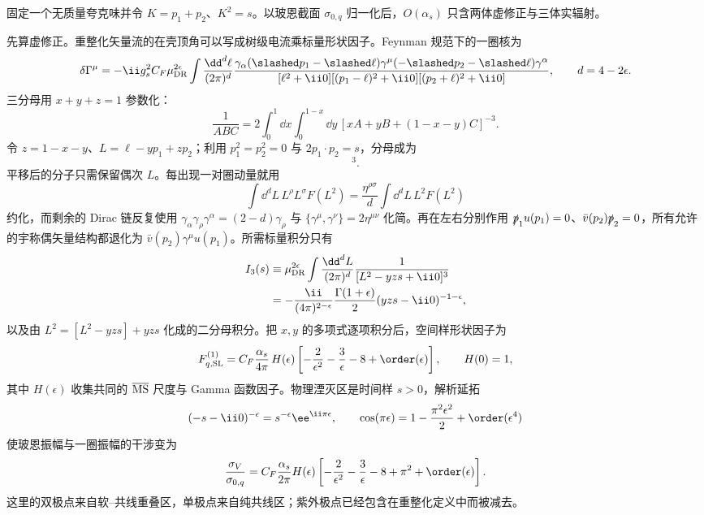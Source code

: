 \begin{derivation}[强子产生率中的实虚抵消]
固定一个无质量夸克味并令 $K=p_1+p_2$、$K^2=s$。以玻恩截面 $\sigma_{0,q}$ 归一化后，$O(\alpha_s)$ 只含两体虚修正与三体实辐射。

先算虚修正。重整化矢量流的在壳顶角可以写成树级电流乘标量形状因子。Feynman 规范下的一圈核为
\begin{equation*}
 \delta\Gamma^\mu
 =-\ii g_s^2 C_F\mu_{\rm DR}^{2\epsilon}
 \int\frac{\dd^d\ell}{(2\pi)^d}
 \frac{\gamma_\alpha(\slashed p_1-\slashed\ell)\gamma^\mu
 (-\slashed p_2-\slashed\ell)\gamma^\alpha}
 {[\ell^2+\ii0][(p_1-\ell)^2+\ii0][(p_2+\ell)^2+\ii0]},
 \qquad d=4-2\epsilon .
\end{equation*}
三分母用 $x+y+z=1$ 参数化：
\begin{equation*}
 \frac1{ABC}
 =2\int_0^1\dd x\int_0^{1-x}\dd y\,
 [xA+yB+(1-x-y)C]^{-3}.
\end{equation*}
令 $z=1-x-y$、$L=\ell-yp_1+zp_2$；利用 $p_1^2=p_2^2=0$ 与 $2p_1\!\cdot p_2=s$，分母成为
\begin{equation*}
 [L^2-yzs+\ii0]^3.
\end{equation*}
平移后的分子只需保留偶次 $L$。每出现一对圈动量就用
\begin{equation*}
 \int\dd^dL\,L^\rho L^\sigma F(L^2)
 =\frac{\eta^{\rho\sigma}}d\int\dd^dL\,L^2F(L^2)
\end{equation*}
约化，而剩余的 Dirac 链反复使用 $\gamma_\alpha\gamma_\rho\gamma^\alpha=(2-d)\gamma_\rho$ 与 $\{\gamma^\mu,\gamma^\nu\}=2\eta^{\mu\nu}$ 化简。再在左右分别作用 $\slashed p_1u(p_1)=0$、$\bar v(p_2)\slashed p_2=0$，所有允许的宇称偶矢量结构都退化为 $\bar v(p_2)\gamma^\mu u(p_1)$。所需标量积分只有
\begin{align*}
 I_3(s)
 &\equiv\mu_{\rm DR}^{2\epsilon}
 \int\frac{\dd^dL}{(2\pi)^d}\frac1{[L^2-yzs+\ii0]^3}\\
 &=-\frac{\ii}{(4\pi)^{2-\epsilon}}
 \frac{\Gamma(1+\epsilon)}{2}
 (yzs-\ii0)^{-1-\epsilon},
\end{align*}
以及由 $L^2=[L^2-yzs]+yzs$ 化成的二分母积分。把 $x,y$ 的多项式逐项积分后，空间样形状因子为
\begin{equation*}
 F_{q,\rm SL}^{(1)}
 =C_F\frac{\alpha_s}{4\pi}\,H(\epsilon)
 \left[-\frac2{\epsilon^2}-\frac3\epsilon-8+\order(\epsilon)\right],
 \qquad H(0)=1,
\end{equation*}
其中 $H(\epsilon)$ 收集共同的 $\overline{\rm MS}$ 尺度与 Gamma 函数因子。物理湮灭区是时间样 $s>0$，解析延拓
\begin{equation*}
 (-s-\ii0)^{-\epsilon}=s^{-\epsilon}\ee^{\ii\pi\epsilon},
 \qquad
 \cos(\pi\epsilon)=1-\frac{\pi^2\epsilon^2}{2}+\order(\epsilon^4)
\end{equation*}
使玻恩振幅与一圈振幅的干涉变为
\begin{equation*}
 \frac{\sigma_V}{\sigma_{0,q}}
 =C_F\frac{\alpha_s}{2\pi}H(\epsilon)
 \left[-\frac2{\epsilon^2}-\frac3\epsilon-8+\pi^2+\order(\epsilon)\right].
\end{equation*}
这里的双极点来自软--共线重叠区，单极点来自纯共线区；紫外极点已经包含在重整化定义中而被减去。


\end{derivation}
